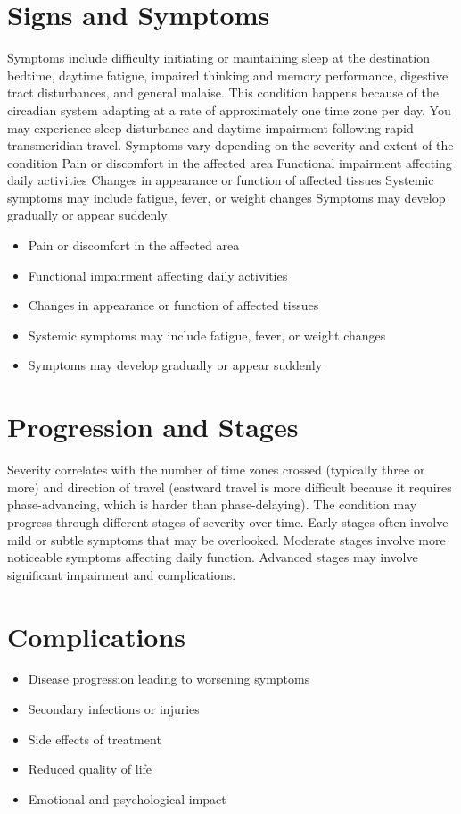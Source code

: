\section{Signs and Symptoms}
Symptoms include difficulty initiating or maintaining sleep at the destination bedtime, daytime fatigue, impaired thinking and memory performance, digestive tract disturbances, and general malaise. This condition happens because of the circadian system adapting at a rate of approximately one time zone per day. You may experience sleep disturbance and daytime impairment following rapid transmeridian travel. Symptoms vary depending on the severity and extent of the condition Pain or discomfort in the affected area Functional impairment affecting daily activities Changes in appearance or function of affected tissues Systemic symptoms may include fatigue, fever, or weight changes Symptoms may develop gradually or appear suddenly

\begin{itemize}[noitemsep]
  \item Pain or discomfort in the affected area
  \item Functional impairment affecting daily activities
  \item Changes in appearance or function of affected tissues
  \item Systemic symptoms may include fatigue, fever, or weight changes
  \item Symptoms may develop gradually or appear suddenly
\end{itemize}
\section{Progression and Stages}
Severity correlates with the number of time zones crossed (typically three or more) and direction of travel (eastward travel is more difficult because it requires phase-advancing, which is harder than phase-delaying). The condition may progress through different stages of severity over time. Early stages often involve mild or subtle symptoms that may be overlooked. Moderate stages involve more noticeable symptoms affecting daily function. Advanced stages may involve significant impairment and complications.
\section{Complications}
\begin{itemize}[noitemsep]
  \item Disease progression leading to worsening symptoms
  \item Secondary infections or injuries
  \item Side effects of treatment
  \item Reduced quality of life
  \item Emotional and psychological impact
\end{itemize}
